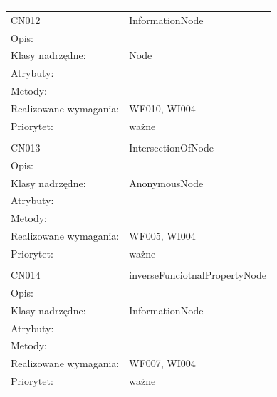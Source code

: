 \documentclass[a4paper,10pt]{article}
\begin{document}
\begin{center}
\begin{longtable}{|m{3cm}|m{9cm}|}
\multicolumn{2}{c}{} \\
 \hline

CN012 & InformationNode \\ \hline
Opis: &     \\ \hline
Klasy nadrzędne: & Node     \\ \hline
Atrybuty: & %
 \\ \hline
Metody: & %
  \\ \hline
Realizowane wymagania: & WF010, WI004 \\ \hline
Priorytet: & ważne  \\ \hline

\multicolumn{2}{c}{} \\
 \hline

CN013 & IntersectionOfNode \\ \hline
Opis: &     \\ \hline
Klasy nadrzędne: & AnonymousNode     \\ \hline
Atrybuty: & %
 \\ \hline
Metody: & %
  \\ \hline
Realizowane wymagania: & WF005, WI004 \\ \hline
Priorytet: & ważne  \\ \hline

\multicolumn{2}{c}{} \\
 \hline

CN014 & inverseFunciotnalPropertyNode \\ \hline
Opis: &     \\ \hline
Klasy nadrzędne: & InformationNode     \\ \hline
Atrybuty: & %
 \\ \hline
Metody: & %
  \\ \hline
Realizowane wymagania: & WF007, WI004 \\ \hline
Priorytet: & ważne  \\ \hline


\end{longtable}
\end{center}
\end{document}
